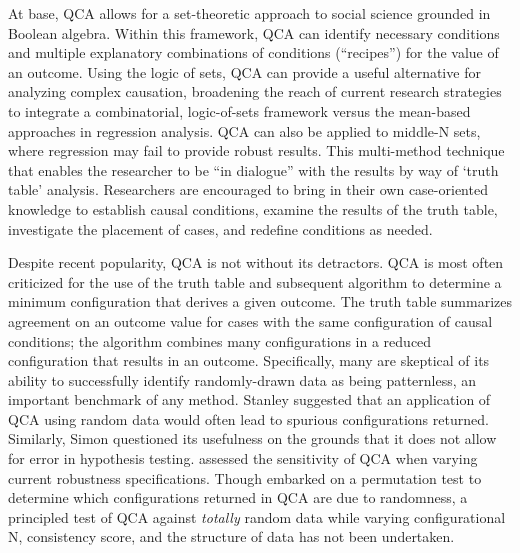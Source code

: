 \documentclass[12pt]{article}
\begin{document}
{%

At base, QCA allows for a set-theoretic approach to social science grounded in Boolean algebra. Within this framework, QCA can identify necessary conditions and multiple explanatory combinations of conditions (``recipes'') for the value of an outcome. Using the logic of sets, QCA can provide a useful alternative for analyzing complex causation, broadening the reach of current research strategies to integrate a combinatorial, logic-of-sets framework versus the mean-based approaches in regression analysis. QCA can also be applied to middle-N sets, where regression may fail to provide robust results. This multi-method technique that enables the researcher to be ``in dialogue'' with the results by way of `truth table' analysis. Researchers are encouraged to bring in their own case-oriented knowledge to establish causal conditions, examine the results of the truth table, investigate the placement of cases, and redefine conditions as needed. %


Despite recent popularity, QCA is not without its detractors. QCA is most often criticized for the use of the truth table and subsequent algorithm to determine a minimum configuration that derives a given outcome. The truth table summarizes agreement on an outcome value for cases with the same configuration of causal conditions; the algorithm combines many configurations in a reduced configuration that results in an outcome. Specifically, many are skeptical of its ability to successfully identify randomly-drawn data as being patternless, an important benchmark of any method. Stanley \citet{lieberson_2004} suggested that an application of QCA using random data would often lead to spurious configurations returned. Similarly, Simon \citet{hug_2013} questioned its usefulness on the grounds that it does not allow for error in hypothesis testing. \citet{skaaning_2011} assessed the sensitivity of QCA when varying current robustness specifications. Though \citet{braumoeller_2015} embarked on a permutation test to determine which configurations returned in QCA are due to randomness, a principled test of QCA against {\it{totally}} random data while varying configurational N, consistency score, and the structure of data has not been undertaken.

}
\end{document}
